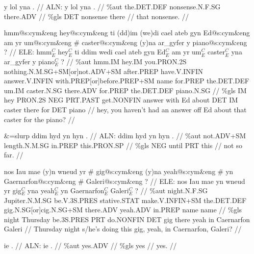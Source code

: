 \documentclass[a4paper,10pt]{article}
\begin{document}
\ex
\begingl[lingstyle=gergl]
\glchat y lol yna . //
\glsurface ALN:  y lol yna .  //
\glauto \%aut  the{\scriptsize .DET.DEF} nonsense{\scriptsize .N.F.SG} there{\scriptsize .ADV}   //
\glmanual \%gls  DET nonsense there   //
\gleng that nonsense. //
\endgl
\xe

\ex
\begingl[lingstyle=gergl]
\glchat hmm@s:cym\&eng hey@s:cym\&eng ti (dd)im (we)di cael ateb gyn Ed@s:cym\&eng am yr um@s:cym\&eng \# caster@s:cym\&eng (y)na ar\_gyfer y piano@s:cym\&eng ? //
\glsurface ELE:  hmm$^{C}_{E}$ hey$^{C}_{E}$ ti ddim wedi cael ateb gyn Ed$^{C}_{E}$ am yr um$^{C}_{E}$ caster$^{C}_{E}$ yna ar\_gyfer y piano$^{C}_{E}$ ?  //
\glauto \%aut  hmm{\scriptsize .IM} hey{\scriptsize .IM} you{\scriptsize .PRON.2S} nothing{\scriptsize .N.M.SG+SM[or]not.ADV+SM} after{\scriptsize .PREP} have{\scriptsize .V.INFIN} answer{\scriptsize .V.INFIN} with{\scriptsize .PREP[or]before.PREP+SM} name for{\scriptsize .PREP} the{\scriptsize .DET.DEF} um{\scriptsize .IM} caster{\scriptsize .N.SG} there{\scriptsize .ADV} for{\scriptsize .PREP} the{\scriptsize .DET.DEF} piano{\scriptsize .N.SG}   //
\glmanual \%gls  IM hey PRON{\scriptsize .2S} NEG PRT{\scriptsize .PAST} get{\scriptsize .NONFIN} answer with Ed about DET IM caster there for DET piano   //
\gleng hey, you haven't had an answer off Ed about that caster for the piano? //
\endgl
\xe

\ex
\begingl[lingstyle=gergl]
\glchat \&=slurp ddim hyd yn hyn . //
\glsurface ALN:  ddim hyd yn hyn .  //
\glauto \%aut  not{\scriptsize .ADV+SM} length{\scriptsize .N.M.SG} in{\scriptsize .PREP} this{\scriptsize .PRON.SP}   //
\glmanual \%gls  NEG until PRT this   //
\gleng not so far. //
\endgl
\xe

\ex
\begingl[lingstyle=gergl]
\glchat nos Iau mae (y)n wneud yr \# gig@s:cym\&eng (y)na yeah@s:cym\&eng \# yn Gaernarfon@s:cym\&eng \# Galeri@s:cym\&eng ? //
\glsurface ELE:  nos Iau mae yn wneud yr gig$^{C}_{E}$ yna yeah$^{C}_{E}$ yn Gaernarfon$^{C}_{E}$ Galeri$^{C}_{E}$ ?  //
\glauto \%aut  night{\scriptsize .N.F.SG} Jupiter{\scriptsize .N.M.SG} be{\scriptsize .V.3S.PRES} stative{\scriptsize .STAT} make{\scriptsize .V.INFIN+SM} the{\scriptsize .DET.DEF} gig{\scriptsize .N.SG[or]cig.N.SG+SM} there{\scriptsize .ADV} yeah{\scriptsize .ADV} in{\scriptsize .PREP} name name   //
\glmanual \%gls  night Thursday be{\scriptsize .3S.PRES} PRT do{\scriptsize .NONFIN} DET gig there yeah in Caernarfon Galeri   //
\gleng Thursday night s/he's doing this gig, yeah, in Caernarfon, Galeri? //
\endgl
\xe

\ex
\begingl[lingstyle=gergl]
\glchat ie . //
\glsurface ALN:  ie .  //
\glauto \%aut  yes{\scriptsize .ADV}   //
\glmanual \%gls  yes   //
\gleng yes. //
\endgl
\xe
\end{document}
